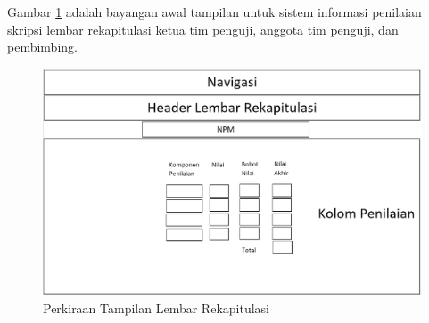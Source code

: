 	Gambar \ref{fig:rekapitulasi} adalah bayangan awal tampilan untuk sistem informasi penilaian skripsi lembar rekapitulasi ketua tim penguji, anggota tim penguji, dan pembimbing.
	\begin{figure}[H]
		\centering
		\includegraphics[scale=0.5]{Gambar/rekapitulasi}
		\caption{Perkiraan Tampilan Lembar Rekapitulasi}
		\label{fig:rekapitulasi}
	\end{figure}